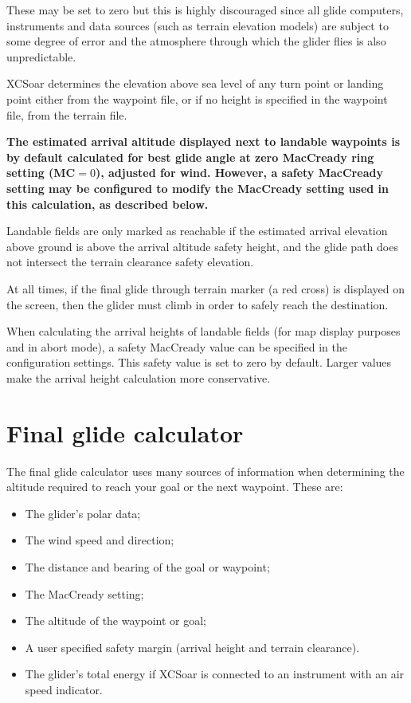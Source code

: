 \warning{}
These may be set to zero but this is highly discouraged since all
glide computers, instruments and data sources (such as terrain
elevation models) are subject to some degree of error and the
atmosphere through which the glider flies is also unpredictable.

XCSoar determines the elevation above sea level of any turn point or
landing point either from the waypoint file, or if no height is
specified in the waypoint file, from the terrain file.

\textbf{The estimated arrival altitude displayed next to landable
  waypoints is by default calculated for best glide angle at zero
  MacCready ring setting (MC$=0$), adjusted for wind.  However, a
  safety MacCready setting may be configured to modify the MacCready
  setting used in this calculation, as described below.}

Landable fields are only marked as reachable if the estimated arrival
elevation above ground is above the arrival altitude safety height,
and the glide path does not intersect the terrain clearance safety
elevation.

At all times, if the final glide through terrain marker (a red
cross) is displayed on the screen, then the glider must climb in order
to safely reach the destination.

When calculating the arrival heights of landable fields (for map
display purposes and in abort mode), a safety MacCready value can be
specified in the configuration settings.  This safety value is set to
zero by default.  Larger values make the arrival height calculation
more conservative.


\section{Final glide calculator}

The final glide calculator uses many sources of information when
determining the altitude required to reach your goal or the next
waypoint. These are:

\begin{itemize}
\item The glider's polar data;
\item The wind speed and direction;
\item The distance and bearing of the goal or waypoint;
\item The MacCready setting;
\item The altitude of the waypoint or goal;
\item A user specified safety margin (arrival height and terrain clearance).
\item The glider's total energy if XCSoar is connected to
  an instrument with an air speed indicator.
\end{itemize}

